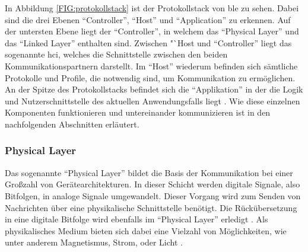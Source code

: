 \noindent In Abbildung \ref{FIG:protokollstack} ist der Protokollstack von \ac{ble} zu sehen. Dabei sind die drei Ebenen "`Controller"', "`Host"' und "`Application"' zu erkennen. Auf der untersten Ebene liegt der "`Controller"', in welchem das "`Physical Layer"' und das "`Linked Layer"' enthalten sind. Zwischen "`Host und "`Controller"' liegt das sogenannte \ac{hci}, welches die Schnittstelle zwischen den beiden Kommunikationspartnern darstellt. Im "`Host"' wiederum befinden sich sämtliche Protokolle und Profile, die notwendig sind, um Kommunikation zu ermöglichen. An der Spitze des Protokollstacks befindet sich die "`Applikation"' in der die Logik und Nutzerschnittstelle des aktuellen Anwendungsfalls liegt \cite[15]{Townsend14:GSB}. Wie diese einzelnen Komponenten funktionieren und untereinander kommunizieren ist in den nachfolgenden Abschnitten erläutert.\\  

\subsubsection{Physical Layer}
\label{sss:funktionsweise:physical}

Das sogenannte "`Physical Layer"' bildet die Basis der Kommunikation bei einer Großzahl von Gerätearchitekturen. In dieser Schicht werden digitale Signale, also Bitfolgen, in analoge Signale umgewandelt. Dieser Vorgang wird zum Senden von Nachrichten über eine physikalische Schnittstelle benötigt. Die Rückübersetzung in eine digitale Bitfolge wird ebenfalls im "`Physical Layer"' erledigt \cite[Seite 16]{Townsend14:GSB}. Als physikalisches Medium bieten sich dabei eine Vielzahl von Möglichkeiten, wie unter anderem Magnetismus, Strom, oder Licht \cite[Seite 95 - 101]{Tanenbaum14:CN}.\\

